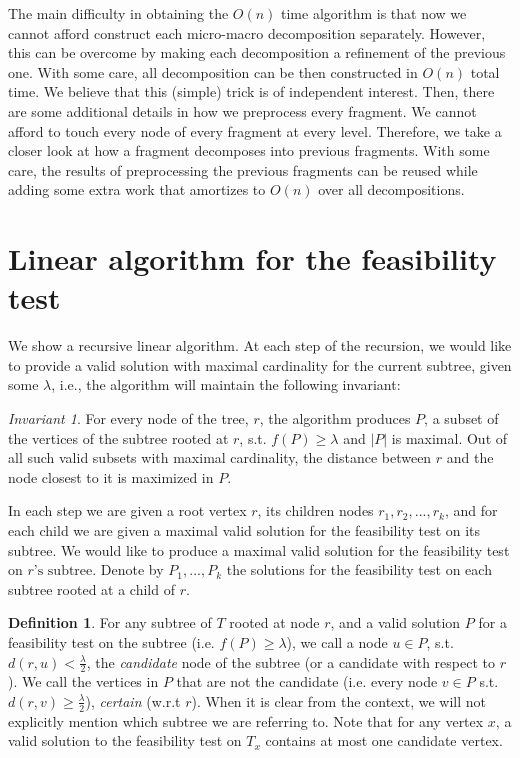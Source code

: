\documentclass[11pt,a4paper]{article}
\newtheorem{algo}{Algorithm}[section]
\theoremstyle{definition}
\newtheorem{definition}{Definition}
\theoremstyle{remark}
\newtheorem{invariant}{Invariant}
\begin{document}
The main difficulty in obtaining the $O(n)$ time algorithm is that now we cannot afford construct each
micro-macro decomposition separately. However, this can be overcome by making each decomposition
a refinement of the previous one. With some care, all decomposition can be then constructed in
$O(n)$ total time. We believe that this (simple) trick is of independent interest. Then, there
are some additional details in how we preprocess every fragment. We cannot afford to touch
every node of every fragment at every level. Therefore, we take a closer look at how a fragment
decomposes into previous fragments. With some care, the results of preprocessing the previous
fragments can be reused while adding some extra work that amortizes to $O(n)$ over all decompositions.

\section{Linear algorithm for the feasibility test}\label{linear F.T.}
We show a recursive linear algorithm. At each step of the recursion, we would like to provide a valid solution with maximal cardinality for the current subtree, given some $\lambda$, i.e., the algorithm will maintain the following invariant:
\begin{invariant}\label{Maximality of P and distance of closest node invariant}
For every node of the tree, $r$, the algorithm produces $P$, a subset of the vertices of the subtree rooted at $r$, s.t. $f(P)\geq\lambda$ and $|P|$ is maximal. Out of all such valid subsets with maximal cardinality, the distance between $r$ and the node closest to it is maximized in $P$.
\end{invariant}
In each step we are given a root vertex $r$, its children nodes $r_{1},r_{2},...,r_{k}$, and for each child we are given a maximal valid solution for the feasibility test on its subtree. We would like to produce a maximal valid solution for the feasibility test on $r\text{'s subtree}$.
Denote by $P_{1},...,P_{k}$ the solutions for the feasibility test on each subtree rooted at a child of $r$.
\begin{definition}
For any subtree of $T$ rooted at node $r$, and a valid solution $P$ for a feasibility test on the subtree (i.e. $f(P)\geq\lambda$), we call a node $u\in P$, s.t. $d(r,u)<\frac{\lambda}{2}$, the \emph{candidate} node of the subtree (or a candidate with respect to $r$). We call the vertices in $P$ that are not the candidate (i.e. every node $v \in P$ s.t. $d(r,v)\geq \frac{\lambda}{2}$), \emph{certain} (w.r.t $r$). When it is clear from the context, we will not explicitly mention which subtree we are referring to.
Note that for any vertex $x$, a valid solution to the feasibility test on $T_x$ contains at most one candidate vertex.
\end{definition}
\end{document}
